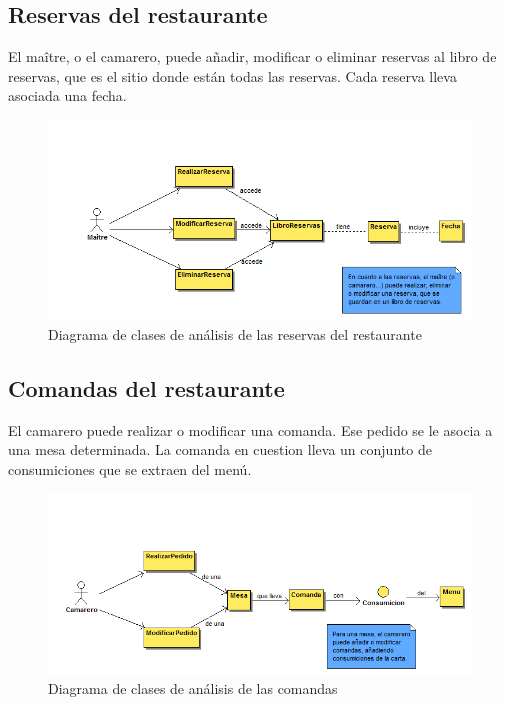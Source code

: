 \documentclass[spanish,a4paper,11pt, twoside]{report}	%
\begin{document}
		\subsection{Reservas del restaurante}
		El maître, o el camarero, puede añadir, modificar o eliminar reservas al libro de reservas, que es el sitio donde están todas las reservas. Cada reserva lleva asociada una fecha.
		\begin{figure}[!h]
		\centering
		\includegraphics[scale=0.5]{DCAresevas.png}
		\caption{Diagrama de clases de análisis de las reservas del restaurante}
		\end{figure}

		\subsection{Comandas del restaurante}
		El camarero puede realizar o modificar una comanda. Ese pedido se le asocia a una mesa determinada. La comanda en cuestion lleva un conjunto de consumiciones que se extraen del menú.
		\begin{figure}[!h]
		\centering
		\includegraphics[scale=0.5]{DCAcomandas.png}
		\caption{Diagrama de clases de análisis de las comandas}
		\end{figure}
\end{document}
